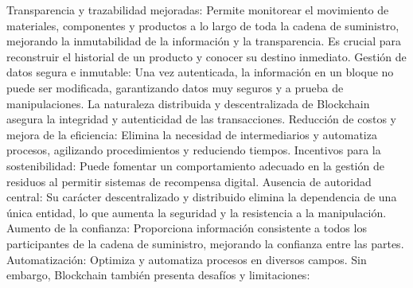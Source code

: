 Transparencia y trazabilidad mejoradas: Permite monitorear el movimiento de materiales, componentes y productos a lo largo de toda la cadena de suministro, mejorando la inmutabilidad de la información y la transparencia. Es crucial para reconstruir el historial de un producto y conocer su destino inmediato.
Gestión de datos segura e inmutable: Una vez autenticada, la información en un bloque no puede ser modificada, garantizando datos muy seguros y a prueba de manipulaciones. La naturaleza distribuida y descentralizada de Blockchain asegura la integridad y autenticidad de las transacciones.
Reducción de costos y mejora de la eficiencia: Elimina la necesidad de intermediarios y automatiza procesos, agilizando procedimientos y reduciendo tiempos.
Incentivos para la sostenibilidad: Puede fomentar un comportamiento adecuado en la gestión de residuos al permitir sistemas de recompensa digital.
Ausencia de autoridad central: Su carácter descentralizado y distribuido elimina la dependencia de una única entidad, lo que aumenta la seguridad y la resistencia a la manipulación.
Aumento de la confianza: Proporciona información consistente a todos los participantes de la cadena de suministro, mejorando la confianza entre las partes.
Automatización: Optimiza y automatiza procesos en diversos campos.
Sin embargo, Blockchain también presenta desafíos y limitaciones:

